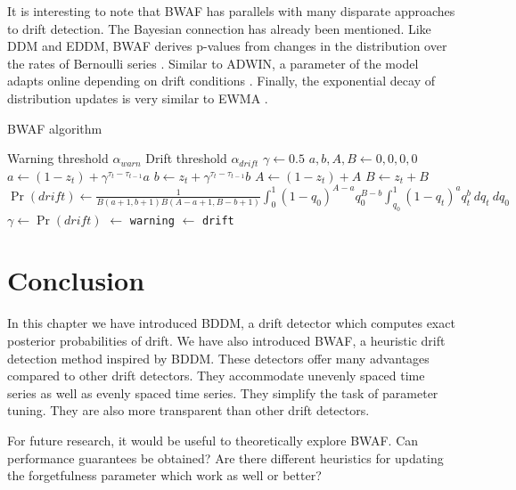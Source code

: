 
It is interesting to note that BWAF has parallels with many disparate approaches to drift detection. The Bayesian connection has already been mentioned. Like DDM and EDDM, BWAF derives p-values from changes in the distribution over the rates of Bernoulli series \cite{DDM}\cite{EDDM}. Similar to ADWIN, a parameter of the model adapts online depending on drift conditions \cite{ADWIN}. Finally, the exponential decay of distribution updates is very similar to EWMA \cite{EWMA}. 

\begin{algorithm}
    \caption{BWAF algorithm}
    \label{alg:bwaf}
    \begin{algorithmic}
        \Require Warning threshold $\alpha_{warn}$
        \Require Drift threshold $\alpha_{drift}$
        \State $\gamma \gets 0.5$
        \State $a,b,A,B \gets 0,0,0,0$
          \State $a \gets (1-z_t) + \gamma^{\tau_t-\tau_{t-1}} a$
          \State $b \gets z_t + \gamma^{\tau_t-\tau_{t-1}} b$
          \State $A \gets (1-z_t) + A$
          \State $B \gets z_t + B$
          \State $\Pr(drift) \gets \frac{1}{B(a+1,b+1)B(A-a+1,B-b+1)}\int_0^1 (1-q_0)^{A-a}q_0^{B-b} \int_{q_0}^1 (1-q_t)^aq_t^b ~dq_t ~ dq_0$
          \State $\gamma \gets \Pr(drift)$
             $\gets$ {\tt warning}
             $\gets$ {\tt drift}
          \EndIf
        \EndFor
    \end{algorithmic}
\end{algorithm}


\section{Conclusion} \label{BDD:conclusion}

In this chapter we have introduced BDDM, a drift detector which computes exact posterior probabilities of drift. We have also introduced BWAF, a heuristic drift detection method inspired by BDDM. These detectors offer many advantages compared to other drift detectors. They accommodate unevenly spaced time series as well as evenly spaced time series. They simplify the task of parameter tuning. They are also more transparent than other drift detectors. %

For future research, it would be useful to theoretically explore BWAF. Can performance guarantees be obtained? Are there different heuristics for updating the forgetfulness parameter which work as well or better?